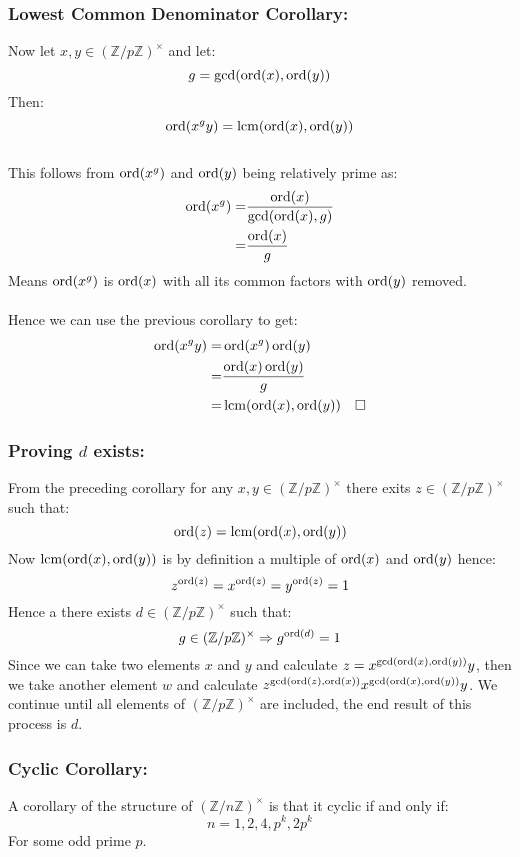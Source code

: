 \subsubsection{Lowest Common Denominator Corollary:}
Now let $x,y\in(\mathbb{Z}/p\mathbb{Z})^\times$ and let:
\[g=\gcd(\operatorname{ord}(x),\operatorname{ord}(y))\]
Then:
\[\operatorname{ord}(x^gy) = \operatorname{lcm}(\operatorname{ord}(x),\operatorname{ord}(y))\]
\\
This follows from $\operatorname{ord}(x^g)$ and $\operatorname{ord}(y)$ being relatively prime as:
\begin{equation*}
\begin{aligned}
	\operatorname{ord}(x^g)=&\frac{\operatorname{ord}(x)}{\gcd(\operatorname{ord}(x),g)}\\
	=&\frac{\operatorname{ord}(x)}{g}\\
\end{aligned}
\end{equation*}
Means $\operatorname{ord}(x^g)$ is $\operatorname{ord}(x)$ with all its common factors with $\operatorname{ord}(y)$ removed.
\\
\\
Hence we can use the previous corollary to get:
\begin{equation*}
\begin{aligned}
	\operatorname{ord}(x^gy)=&\operatorname{ord}(x^g)\operatorname{ord}(y)\\
	=&\frac{\operatorname{ord}(x)\operatorname{ord}(y)}{g}\\
	=&\operatorname{lcm}(\operatorname{ord}(x),\operatorname{ord}(y)) \quad \square\\
\end{aligned}
\end{equation*}

\subsubsection{Proving $d$ exists:}
From the preceding corollary for any $x,y\in(\mathbb{Z}/p\mathbb{Z})^\times$ there exits $z\in(\mathbb{Z}/p\mathbb{Z})^\times$ such that:
\[\operatorname{ord}(z) = \operatorname{lcm}(\operatorname{ord}(x),\operatorname{ord}(y))\]
Now $\operatorname{lcm}(\operatorname{ord}(x),\operatorname{ord}(y))$ is by definition a multiple of $\operatorname{ord}(x)$ and $\operatorname{ord}(y)$ hence:
\[z^{\operatorname{ord}(z)}=x^{\operatorname{ord}(z)}=y^{\operatorname{ord}(z)}=1\]
Hence a there exists $d\in(\mathbb{Z}/p\mathbb{Z})^\times$ such that:
\[g\in(\mathbb{Z}/p\mathbb{Z})^\times \Rightarrow g^{\operatorname{ord}(d)}=1\]
Since we can take two elements $x$ and $y$ and calculate $z=x^{\gcd(\operatorname{ord}(x),\operatorname{ord}(y))}y$,
then we take another element $w$ and calculate $z^{\gcd(\operatorname{ord}(z),\operatorname{ord}(x))}x^{\gcd(\operatorname{ord}(x),\operatorname{ord}(y))}y$.
We continue until all elements of $(\mathbb{Z}/p\mathbb{Z})^\times$ are included,
the end result of this process is $d$.

\subsubsection{Cyclic Corollary:}
\label{appx:cycle-multiplicative-group}
A corollary of the structure of $(\mathbb{Z}/n\mathbb{Z})^\times$ is that it cyclic if and only if:
\[n = 1,2,4,p^k,2p^k\]
For some odd prime $p$.
\\

